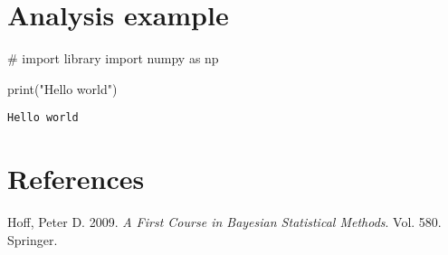 \documentclass[
  letterpaper,
  DIV=11,
  numbers=noendperiod]{scrreprt}
\newenvironment{Shaded}{\begin{snugshade}}{\end{snugshade}}
\newcommand{\BuiltInTok}[1]{\textcolor[rgb]{0.00,0.23,0.31}{#1}}
\newcommand{\CommentTok}[1]{\textcolor[rgb]{0.37,0.37,0.37}{#1}}
\newcommand{\ImportTok}[1]{\textcolor[rgb]{0.00,0.46,0.62}{#1}}
\newcommand{\NormalTok}[1]{\textcolor[rgb]{0.00,0.23,0.31}{#1}}
\newcommand{\StringTok}[1]{\textcolor[rgb]{0.13,0.47,0.30}{#1}}
\newlength{\cslhangindent}
\newlength{\cslentryspacingunit} %
\newenvironment{CSLReferences}[2] %
 {%
  \setlength{\parindent}{0pt}
  \ifodd #1
  \let\oldpar\par
  \def\par{\hangindent=\cslhangindent\oldpar}
  \fi
  \setlength{\parskip}{#2\cslentryspacingunit}
 }%
 {}
\begin{document}

\hypertarget{analysis-example}{%
\chapter{Analysis example}\label{analysis-example}}

\begin{Shaded}
\begin{Highlighting}[]
\CommentTok{\# import library}
\ImportTok{import}\NormalTok{ numpy }\ImportTok{as}\NormalTok{ np}
\end{Highlighting}
\end{Shaded}

\begin{Shaded}
\begin{Highlighting}[]
\BuiltInTok{print}\NormalTok{(}\StringTok{"Hello world"}\NormalTok{)}
\end{Highlighting}
\end{Shaded}

\begin{verbatim}
Hello world
\end{verbatim}


\hypertarget{references-1}{%
\chapter*{References}\label{references-1}}

\hypertarget{refs}{}
\begin{CSLReferences}{1}{0}
\leavevmode{}%
Hoff, Peter D. 2009. \emph{A First Course in Bayesian Statistical
Methods}. Vol. 580. Springer.

\end{CSLReferences}
\end{document}
